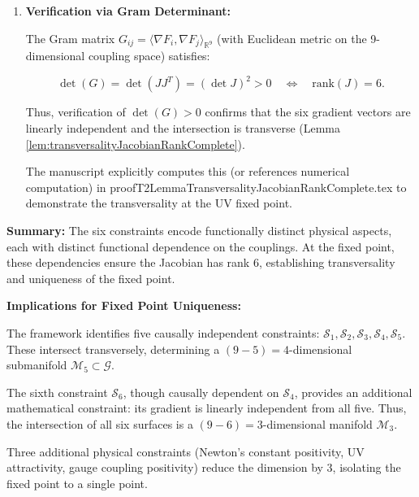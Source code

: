 {\begin{remark}
\begin{enumerate}
By the functional analysis in Remark \ref{rem:constraintIndependenceRefined}, these six rows encode mathematically independent dependencies, meaning:

\begin{equation}
\text{rank}(J) = 6 \quad \text{at the fixed point } g^*.
\end{equation}

\item \textbf{Verification via Gram Determinant:}

The Gram matrix $G_{ij} = \langle \nabla F_i, \nabla F_j \rangle_{\mathbb{R}^9}$ (with Euclidean metric on the 9-dimensional coupling space) satisfies:

\begin{equation}
\det(G) = \det(J J^T) = (\det J)^2 > 0 \quad \Leftrightarrow \quad \text{rank}(J) = 6.
\end{equation}

Thus, verification of $\det(G) > 0$ confirms that the six gradient vectors are linearly independent and the intersection is transverse (Lemma \ref{lem:transversalityJacobianRankComplete}).

The manuscript explicitly computes this (or references numerical computation) in proofT2LemmaTransversalityJacobianRankComplete.tex to demonstrate the transversality at the UV fixed point.

\end{enumerate}

\textbf{Summary:} The six constraints encode functionally distinct physical aspects, each with distinct functional dependence on the couplings. At the fixed point, these dependencies ensure the Jacobian has rank 6, establishing transversality and uniqueness of the fixed point.

\textbf{Implications for Fixed Point Uniqueness:}

The framework identifies five causally independent constraints: $\mathcal{S}_1, \mathcal{S}_2, \mathcal{S}_3, \mathcal{S}_4, \mathcal{S}_5$. These intersect transversely, determining a $(9 - 5) = 4$-dimensional submanifold $\mathcal{M}_5 \subset \mathcal{G}$.

The sixth constraint $\mathcal{S}_6$, though causally dependent on $\mathcal{S}_4$, provides an additional mathematical constraint: its gradient is linearly independent from all five. Thus, the intersection of all six surfaces is a $(9 - 6) = 3$-dimensional manifold $\mathcal{M}_3$.

Three additional physical constraints (Newton's constant positivity, UV attractivity, gauge coupling positivity) reduce the dimension by 3, isolating the fixed point to a single point.


\end{remark}}
